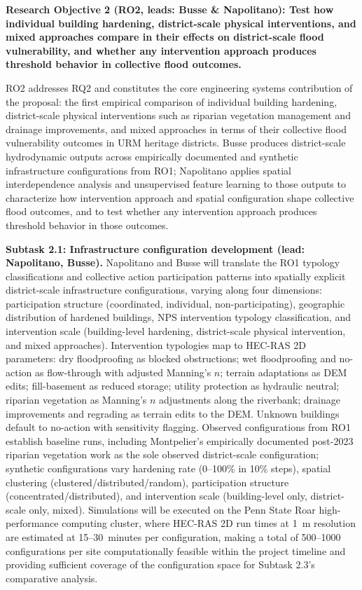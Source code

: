 \documentclass[11pt]{article}
\begin{document}
\begin{tcolorbox}[colback=rootwocol!60,colframe=black,boxrule=1pt,coltext=black,
  left=1mm,right=1mm,top=1mm,bottom=1mm]
\textbf{Research Objective 2 (RO2, leads: Busse \& Napolitano): Test how individual
building hardening, district-scale physical interventions, and mixed approaches
compare in their effects on district-scale flood vulnerability, and whether any
intervention approach produces threshold behavior in collective flood outcomes.}
\end{tcolorbox}
RO2 addresses RQ2 and constitutes the core engineering systems contribution of the
proposal: the first empirical comparison of individual building hardening,
district-scale physical interventions such as riparian vegetation management and
drainage improvements, and mixed approaches in terms of their collective flood
vulnerability outcomes in URM heritage districts.
Busse produces district-scale hydrodynamic outputs across empirically documented
and synthetic infrastructure configurations from RO1; Napolitano applies spatial
interdependence analysis and unsupervised feature learning to those outputs to
characterize how intervention approach and spatial configuration shape collective
flood outcomes, and to test whether any intervention approach produces threshold
behavior in those outcomes.

\textbf{Subtask 2.1: Infrastructure configuration development (lead: Napolitano, Busse).}
Napolitano and Busse will translate the RO1 typology classifications and collective
action participation patterns into spatially explicit district-scale infrastructure
configurations, varying along four dimensions: participation structure (coordinated,
individual, non-participating), geographic distribution of hardened buildings,
NPS intervention typology classification, and intervention scale (building-level
hardening, district-scale physical intervention, and mixed approaches).
Intervention typologies map to HEC-RAS 2D parameters: dry floodproofing as blocked
obstructions; wet floodproofing and no-action as flow-through with adjusted
Manning's $n$; terrain adaptations as DEM edits; fill-basement as reduced storage;
utility protection as hydraulic neutral; riparian vegetation as Manning's $n$
adjustments along the riverbank; drainage improvements and regrading as terrain
edits to the DEM.
Unknown buildings default to no-action with sensitivity flagging.
Observed configurations from RO1 establish baseline runs, including Montpelier's
empirically documented post-2023 riparian vegetation work as the sole observed
district-scale configuration; synthetic configurations vary hardening rate
(0--100\% in 10\% steps), spatial clustering (clustered/distributed/random),
participation structure (concentrated/distributed), and intervention scale
(building-level only, district-scale only, mixed).
Simulations will be executed on the Penn State Roar high-performance computing
cluster, where HEC-RAS 2D run times at 1~m resolution are estimated at
15--30~minutes per configuration, making a total of 500--1000 configurations
per site computationally feasible within the project timeline and providing
sufficient coverage of the configuration space for Subtask 2.3's comparative
analysis.
\end{document}
